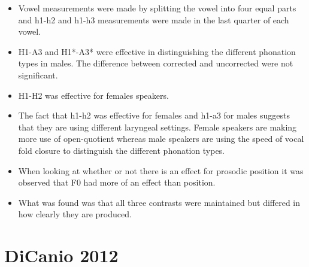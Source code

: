 \documentclass[12pt, letterpaper]{article}
\begin{document}
\begin{itemize}
	\item Vowel measurements were made by splitting the vowel into four equal parts and h1-h2 and h1-h3 measurements were made in the last quarter of each vowel. 
	\item H1-A3 and H1*-A3* were effective in distinguishing the different phonation types in males. The difference between corrected and uncorrected were not significant. 
	\item H1-H2 was effective for females speakers. 
	\item The fact that h1-h2 was effective for females and h1-a3 for males suggests that they are using different laryngeal settings. Female speakers are making more use of open-quotient whereas male speakers are using the speed of vocal fold closure to distinguish the different phonation types. 
	\item When looking at whether or not there is an effect for prosodic position it was observed that F0 had more of an effect than position. 
	\item What was found was that all three contrasts were maintained but differed in how clearly they are produced. 
\end{itemize}

\section{DiCanio 2012} \label{sec:DiCanio}
\end{document}
